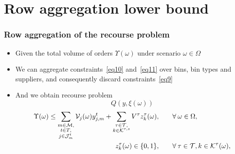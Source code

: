 \documentclass[,9pt,xcolor={dvipsnames}]{beamer} %
\begin{document}
\section{Row aggregation lower bound}
\begin{frame}%
	\frametitle{Row aggregation of the recourse problem}
	\begin{itemize}
		\item<1-> Given the total volume of orders $\Upsilon (\omega)$ under scenario $ \omega \in \Omega$
		\bigskip
		\item<2-> We can aggregate constraints~\eqref{eq10} and~\eqref{eq11} over bins, bin types and suppliers, and consequently discard constraints~\eqref{eq9}
		\bigskip
		\item<3-> And we obtain recourse problem
		{
			\small
			\begin{equation*}
				Q \left(y,\xi (\omega)\right)
			\end{equation*}
			\begin{alignat}{2}
				\Upsilon (\omega) \leq \sum\limits_{\substack{ m \in {\cal M}, \\ t \in T, \\ j \in {\cal J}^t_{m}}} {\cal V}_{j}(\omega) y_{j,m}^t + \sum\limits_{\substack{\tau \in {\cal T}, \\ k \in {\cal K}^{\tau,s}}} V^\tau z^{\tau}_k(\omega), & \qquad \forall \: \omega \in \Omega, \label{eq10lb}\\
				z_k^{\tau}(\omega) \in \{0, 1\}, & \qquad \forall \: \tau \in {\cal T}, k \in {\cal K}^{\tau}(\omega), \label{eq14lb}
			\end{alignat}
		}
	\end{itemize}
\end{frame}
\end{document}
